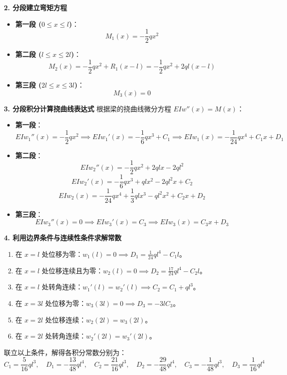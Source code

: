 \documentclass[11pt,a4paper]{ctexrep}
\begin{document}
{\textbf{2. 分段建立弯矩方程}
\begin{itemize}
    \item \textbf{第一段 ($0 \le x \le l$)}：
    \[
    M_1(x) = -\frac{1}{2}qx^2
    \]
    \item \textbf{第二段 ($l \le x \le 2l$)}：
    \[
    M_2(x) = -\frac{1}{2}qx^2 + R_1(x-l) = -\frac{1}{2}qx^2 + 2ql(x-l)
    \]
    \item \textbf{第三段 ($2l \le x \le 3l$)}：
    \[
    M_3(x) = 0
    \]
\end{itemize}

\textbf{3. 分段积分计算挠曲线表达式}
根据梁的挠曲线微分方程 $EI w''(x) = M(x)$：
\begin{itemize}
    \item \textbf{第一段}：
    \[
    EI w_1''(x) = -\frac{1}{2}qx^2 \implies EI w_1'(x) = -\frac{1}{6}qx^3 + C_1 \implies EI w_1(x) = -\frac{1}{24}qx^4 + C_1 x + D_1
    \]
    \item \textbf{第二段}：
    \[
    EI w_2''(x) = -\frac{1}{2}qx^2 + 2qlx - 2ql^2
    \]
    \[
    EI w_2'(x) = -\frac{1}{6}qx^3 + qlx^2 - 2ql^2 x + C_2
    \]
    \[
    EI w_2(x) = -\frac{1}{24}qx^4 + \frac{1}{3}qlx^3 - ql^2 x^2 + C_2 x + D_2
    \]
    \item \textbf{第三段}：
    \[
    EI w_3''(x) = 0 \implies EI w_3'(x) = C_3 \implies EI w_3(x) = C_3 x + D_3
    \]
\end{itemize}

\textbf{4. 利用边界条件与连续性条件求解常数}
\begin{enumerate}[label=(\arabic*)]
    \item 在 $x=l$ 处位移为零：$w_1(l) = 0 \implies D_1 = \frac{1}{24}ql^4 - C_1 l$。
    \item 在 $x=l$ 处位移连续且为零：$w_2(l) = 0 \implies D_2 = \frac{17}{24}ql^4 - C_2 l$。
    \item 在 $x=l$ 处转角连续：$w_1'(l) = w_2'(l) \implies C_2 = C_1 + ql^3$。
    \item 在 $x=3l$ 处位移为零：$w_3(3l) = 0 \implies D_3 = -3l C_3$。
    \item 在 $x=2l$ 处位移连续：$w_2(2l) = w_3(2l)$。
    \item 在 $x=2l$ 处转角连续：$w_2'(2l) = w_3'(2l)$。
\end{enumerate}

联立以上条件，解得各积分常数分别为：
\[
C_1 = \frac{5}{16}ql^3, \quad D_1 = -\frac{13}{48}ql^4, \quad C_2 = \frac{21}{16}ql^3, \quad D_2 = -\frac{29}{48}ql^4, \quad C_3 = -\frac{1}{48}ql^3, \quad D_3 = \frac{1}{16}ql^4
\]

}
\end{document}

